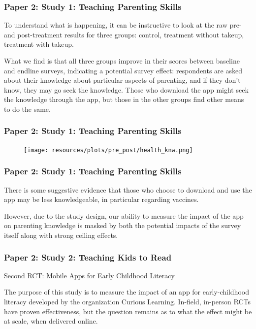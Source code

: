 \documentclass[aspectratio=169]{beamer}
\begin{document}
\begin{frame}
\frametitle{Paper 2: Study 1: Teaching Parenting Skills} 

To understand what is happening, it can be instructive to look at the raw pre- and post-treatment results for three groups: control, treatment without takeup, treatment with takeup. 

What we find is that all three groups improve in their scores between baseline and endline surveys, indicating a potential survey effect: respondents are asked about their knowledge about particular aspects of parenting, and if they don't know, they may go seek the knowledge. Those who download the app might seek the knowledge through the app, but those in the other groups find other means to do the same. 

\end{frame}

\begin{frame}
\frametitle{Paper 2: Study 1: Teaching Parenting Skills} 

\begin{figure}[H]
\texttt{[image: resources/plots/pre\_post/health\_knw.png]}  
\end{figure}   
\end{frame}
  
\begin{frame}
\frametitle{Paper 2: Study 1: Teaching Parenting Skills} 

There is some suggestive evidence that those who choose to download and use the app may be less knowledgeable, in particular regarding vaccines.

However, due to the study design, our ability to measure the impact of the app on parenting knowledge is masked by both the potential impacts of the survey itself along with strong ceiling effects. 
  
\end{frame}


\begin{frame}
\frametitle{Paper 2: Study 2: Teaching Kids to Read}

Second RCT: Mobile Apps for Early Childhood Literacy 

The purpose of this study is to measure the impact of an app for early-childhood literacy developed by the organization Curious Learning. In-field, in-person RCTs have proven effectiveness, but the question remains as to what the effect might be at scale, when delivered online. 

\end{frame}
\end{document}
